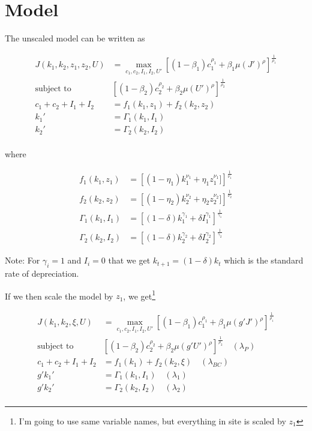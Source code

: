 \documentclass[10pt]{article}
\begin{document}
\section{Model}

  The unscaled model can be written as

  \begin{align*}
    J(k_1, k_2, z_1, z_2, U) &= \max_{c_1, c_2, I_1, I_2, U'} \left[ (1 - \beta_1) c_1^{\rho_1} + \beta_1 \mu(J')^\rho \right]^{\frac{1}{\rho_1}} \\
    \text{subject to }& \left[ (1 - \beta_2) c_2^{\rho_2} + \beta_2 \mu(U')^\rho \right]^{\frac{1}{\rho_2}} \\
    c_1 + c_2 + I_1 + I_2 &= f_1(k_1, z_1) + f_2(k_2, z_2) \\
    k_1' &= \Gamma_1(k_1, I_1) \\
    k_2' &= \Gamma_2(k_2, I_2) \\
  \end{align*}

  where

  \begin{align*}
    f_1(k_1, z_1) &= \left[(1 - \eta_1) k_1^{\nu_1} + \eta_1 z_1^{\nu_1}] \right]^{\frac{1}{\nu_1}} \\
    f_2(k_2, z_2) &= \left[(1 - \eta_2) k_2^{\nu_2} + \eta_2 z_2^{\nu_2}] \right]^{\frac{1}{\nu_2}} \\
    \Gamma_1(k_1, I_1) &= \left[(1 - \delta) k_1^{\gamma_1} + \delta I_1^{\gamma_1} \right]^{\frac{1}{\gamma_1}} \\
    \Gamma_2(k_2, I_2) &= \left[(1 - \delta) k_2^{\gamma_2} + \delta I_2^{\gamma_2} \right]^{\frac{1}{\gamma_2}}
  \end{align*}

  Note: For $\gamma_i = 1$ and $I_i = 0$ that we get $k_{t+1} = (1 - \delta) k_t$ which is the standard rate of depreciation.

  If we then scale the model by $z_1$, we get\footnote{I'm going to use same variable names, but everything in site is scaled by $z_1$}

  \begin{align*}
    J(k_1, k_2, \xi, U) &= \max_{c_1, c_2, I_1, I_2, U'} \left[ (1 - \beta_1) c_1^{\rho_1} + \beta_1 \mu(g' J')^\rho \right]^{\frac{1}{\rho_1}} \\
    \text{subject to }& \left[ (1 - \beta_2) c_2^{\rho_2} + \beta_2 \mu(g' U')^\rho \right]^{\frac{1}{\rho_2}} \quad (\lambda_P) \\
    c_1 + c_2 + I_1 + I_2 &= f_1(k_1) + f_2(k_2, \xi) \quad (\lambda_{BC}) \\
    g' k_1' &= \Gamma_1(k_1, I_1) \quad (\lambda_1) \\
    g' k_2' &= \Gamma_2(k_2, I_2) \quad (\lambda_2) \\
  \end{align*}
\end{document}
